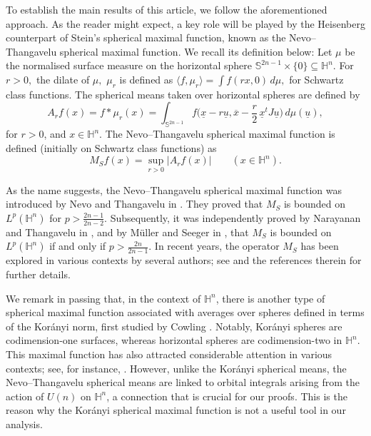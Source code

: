 \documentclass[11pt]{amsart}
\newcommand{\Ha}{\mathbb{H}^n}
\theoremstyle{definition}
\numberwithin{equation}{section}
\begin{document}
 


To establish the main results of this article, we follow the aforementioned approach. As the reader might expect, a key role will be played by the Heisenberg counterpart of Stein's spherical maximal function, known as the Nevo--Thangavelu spherical maximal function. We recall its definition below: Let $\mu$ be the normalised surface measure on the horizontal sphere $\mathbb{S}^{2n-1} \times \{0\} \subseteq \Ha$. For $r>0,$ the dilate of $\mu,$ $\mu_{r}$ is defined as $\langle f, \mu_{r}\rangle=\int f(rx, 0)\, d\mu,$ for Schwartz class functions. The spherical means taken over horizontal spheres are defined by  
\begin{equation}\label{eq: horizontal spherical av}
    A_{r} f(x)=f*\mu_{r}(x) = \int_{\mathbb{S}^{2n-1}} f\big(\underline{x}-r \underline{u}, \overline{x}- {\textstyle\frac{r}{2} }   \, \underline{x}^t J \underline{u}\big) \,d\mu(\underline{u}), 
\end{equation}
for $r>0$, and $x\in \Ha$. The Nevo--Thangavelu spherical maximal function is defined (initially on Schwartz class functions) as $$M_{S}f(x)=\sup_{r>0}|A_{r}f(x)|\quad\quad(x\in \Ha).$$

As the name suggests, the Nevo--Thangavelu spherical maximal function was introduced by Nevo and Thangavelu in \cite{NeT}. They proved that $M_{S}$ is bounded on $L^p(\mathbb{H}^n)$ for $p > \frac{2n-1}{2n-2}$.
Subsequently, it was independently proved by Narayanan and Thangavelu in \cite{NaT}, and by Müller and Seeger in \cite{MS}, that $M_{S}$ is bounded on $L^p(\mathbb{H}^n)$ if and only if $p > \frac{2n}{2n-1}$. In recent years, the operator $M_{S}$ has been explored in various contexts by several authors; see \cite{BHRT, Roos} and the references therein for further details. 


We remark in passing that, in the context of $\mathbb{H}^n$, there is another type of spherical maximal function associated with averages over spheres defined in terms of the Korányi norm, first studied by Cowling \cite{Cowling}. Notably, Kor\'anyi spheres are codimension-one surfaces, whereas horizontal spheres are codimension-two in $\mathbb{H}^n$. This maximal function has also attracted considerable attention in various contexts; see, for instance, \cite{GT, Raj}. However, unlike the Korányi spherical means,  the Nevo–Thangavelu spherical means are linked to orbital integrals arising from the action of $U(n)$ on $\mathbb{H}^n$, a connection that is crucial for our proofs. This is the reason why the Kor\'anyi spherical maximal function is not a useful tool in our analysis.
\end{document}
